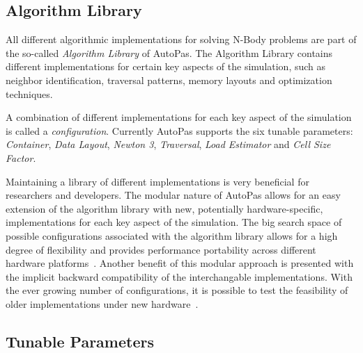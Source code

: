 \documentclass[conference]{IEEEtran}
\begin{document}
\subsection{Algorithm Library}

All different algorithmic implementations for solving N-Body problems are part of the so-called \textit{Algorithm Library} of AutoPas. The Algorithm Library contains different implementations for certain key aspects of the simulation, such as neighbor identification, traversal patterns, memory layouts and optimization techniques.

A combination of different implementations for each key aspect of the simulation is called a \textit{configuration}. Currently AutoPas supports the six tunable parameters: \textit{Container}, \textit{Data Layout}, \textit{Newton 3}, \textit{Traversal}, \textit{Load Estimator} and \textit{Cell Size Factor}.

Maintaining a library of different implementations is very beneficial for researchers and developers. The modular nature of AutoPas allows for an easy extension of the algorithm library with new, potentially hardware-specific, implementations for each key aspect of the simulation.
The big search space of possible configurations associated with the algorithm library allows for a high degree of flexibility and provides performance portability across different hardware platforms~\cite{Tchipev2020}. Another benefit of this modular approach is presented with the implicit backward compatibility of the interchangable implementations. With the ever growing number of configurations, it is possible to test the feasibility of older implementations under new hardware~\cite{Tchipev2020}.

\subsection{Tunable Parameters}
\end{document}

